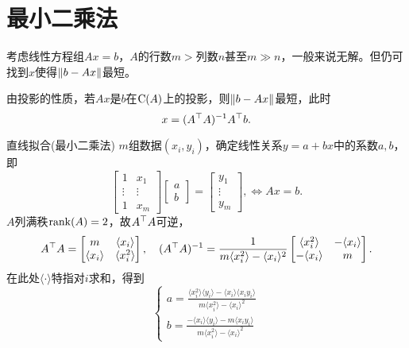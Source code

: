 \section{最小二乘法}
考虑线性方程组$Ax=b$，$A$的行数$m>$列数$n$甚至$m\gg n$，一般来说无解。但仍可找到$x$使得$\left\lVert b-Ax\right\rVert$最短。

由投影的性质，若$Ax$是$b$在$\operatorname{C}(A)$上的投影，则$\left\lVert b-Ax\right\rVert$最短，此时
\[
	x=(A^\top A)^{-1} A^\top b.
\]
\begin{method}{直线拟合(最小二乘法)}{}
	$m$组数据$(x_i,y_i)$，确定线性关系$y=a+bx$中的系数$a,b$，即 
	\[
		\begin{bmatrix}
			1&x_1\\\vdots&\vdots\\1&x_m
		\end{bmatrix}
		\begin{bmatrix}
			a\\b
		\end{bmatrix}=
		\begin{bmatrix}
			y_1\\\vdots\\y_m
		\end{bmatrix},\iff Ax=b.
	\]
	\newcommand*{\sumi}[1]{\langle{#1}\rangle}
	$A$列满秩$\operatorname{rank}(A)=2$，故$A^\top A$可逆，
	\[
		A\tp A=
		\begin{bmatrix}
			m&\sumi{x_i}\\
			\sumi{x_i}&\sumi{x_i^2}
		\end{bmatrix},\quad
		(A\tp A)\iv=\frac1{m\sumi{x_i^2}-\sumi{x_i}^2}
		\begin{bmatrix}
			\sumi{x_i^2}&-\sumi{x_i}\\
			-\sumi{x_i}&m
		\end{bmatrix}.
	\]
	在此处$\sumi{\cdot}$特指对$i$求和，得到 
	\[
		\begin{cases}
			a=\frac{\sumi{x_i^2}\sumi{y_i}-\sumi{x_i}\sumi{x_iy_i}}{m\sumi{x_i^2}-\sumi{x_i}^2}\\
			b=\frac{-\sumi{x_i}\sumi{y_i}-m\sumi{x_iy_i}}{m\sumi{x_i^2}-\sumi{x_i}^2}
		\end{cases}
	\]
	\iffalse
	\[
		A\tp A=
		\begin{bmatrix}
			n&\textstyle\sum_{i=1}^n x_i\\
			\textstyle\sum_{i=1}^n x_i&\textstyle\sum_{i=1}^n x_i^2
		\end{bmatrix}
	\]
	则
	\[
		(A\tp A)\iv=\frac1{\textstyle{n\sum_{i=1}^n x_i^2-\bigkh{\sum_{i=1}^n x_i}^2}}
		\begin{bmatrix}
			\textstyle\sum_{i=1}^n x_i^2&-\textstyle\sum_{i=1}^n x_i\\
			-\textstyle\sum_{i=1}^n x_i&n
		\end{bmatrix}
	\]
	得到 
	\[
		\begin{cases}
			a=\frac{\textstyle\sum_{i=1}^n x_i^2\sum_{i=1}^n y_i-\sum_{i=1}^n x_i\sum_{i=1}^n x_iy_i}{\textstyle{n\sum_{i=1}^n x_i^2-\bigkh{\sum_{i=1}^n x_i}^2}}\\[2ex]
			b=\frac{\textstyle-\sum_{i=1}^n x_i\sum_{i=1}^n y_i-n\sum_{i=1}^n x_iy_i}{\textstyle{n\sum_{i=1}^n x_i^2-\bigkh{\sum_{i=1}^n x_i}^2}}
		\end{cases}
	\]
	\fi
\end{method}
